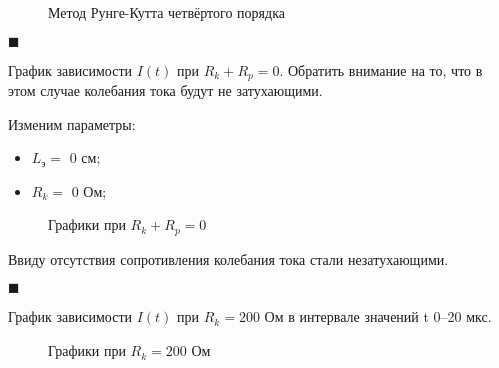 \begin{figure}[H]
    \caption{Метод Рунге-Кутта четвёртого порядка}\label{img:plot02}
    
\end{figure}

\noindent$\blacksquare$

График зависимости $I(t)$ при $R_k + R_p = 0$. Обратить внимание на то, что в этом случае колебания тока будут не затухающими.

Изменим параметры:
\begin{itemize}
    \item $L_{\text{э}}  =$ 0 см;
    \item $R_k  =$ 0 Ом;
\end{itemize}
\begin{figure}[H]
    \caption{Графики при $R_k + R_p = 0$}\label{img:plot03}
    
\end{figure}
Ввиду отсутствия сопротивления колебания тока стали незатухающими.

\noindent$\blacksquare$

График зависимости $I(t)$ при $R_k = 200$ Ом в интервале значений t 0--20 мкс.
\begin{figure}[H]
    \caption{Графики при $R_k = 200$ Ом}\label{img:plot04}
    
\end{figure}

